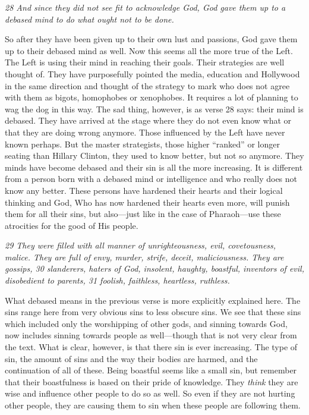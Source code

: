 \emph{28 And since they did not see fit to acknowledge God, God gave
them up to a debased mind to do what ought not to be done.}

So after they have been given up to their own lust and passions, God
gave them up to their debased mind as well. Now this seems all the more
true of the Left. The Left is using their mind in reaching their goals.
Their strategies are well thought of. They have purposefully pointed the
media, education and Hollywood in the same direction and thought of the
strategy to mark who does not agree with them as bigots, homophobes or
xenophobes. It requires a lot of planning to wag the dog in this way.
The sad thing, however, is as verse 28 says: their mind is debased. They
have arrived at the stage where they do not even know what or that they
are doing wrong anymore. Those influenced by the Left have never known
perhaps. But the master strategists, those higher ``ranked'' or longer
seating than Hillary Clinton, they used to know better, but not so
anymore. They minds have become debased and their sin is all the more
increasing. It is different from a person born with a debased mind or
intelligence and who really does not know any better. These persons have
hardened their hearts and their logical thinking and God, Who has now
hardened their hearts even more, will punish them for all their sins,
but also---just like in the case of Pharaoh---use these atrocities for
the good of His people.

\emph{29 They were filled with all manner of unrighteousness, evil,
covetousness, malice. They are full of envy, murder, strife, deceit,
maliciousness. They are gossips, 30 slanderers, haters of God, insolent,
haughty, boastful, inventors of evil, disobedient to parents, 31
foolish, faithless, heartless, ruthless.}

What debased means in the previous verse is more explicitly explained
here. The sins range here from very obvious sins to less obscure sins.
We see that these sins which included only the worshipping of other
gods, and sinning towards God, now includes sinning towards people as
well---though that is not very clear from the text. What is clear,
however, is that there sin is ever increasing. The type of sin, the
amount of sins and the way their bodies are harmed, and the continuation
of all of these. Being boastful seems like a small sin, but remember
that their boastfulness is based on their pride of knowledge. They
\emph{think} they are wise and influence other people to do so as well.
So even if they are not hurting other people, they are causing them to
sin when these people are following them.

